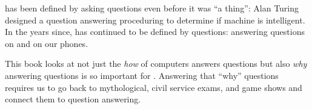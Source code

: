 

 has been defined by asking questions even before it was ``a
thing'': Alan Turing designed a question answering proceduring to
determine if machine is intelligent.
%
In the years since,  has continued to be defined by questions:
answering questions on \jeopardy{} and on our phones.

This book looks at not just the \emph{how} of computers answers
questions but also \emph{why} answering questions is so important
for .
%
Answering that ``why'' questions requires us to go back to
mythological, civil service exams, and game shows and connect them
to  question answering.

